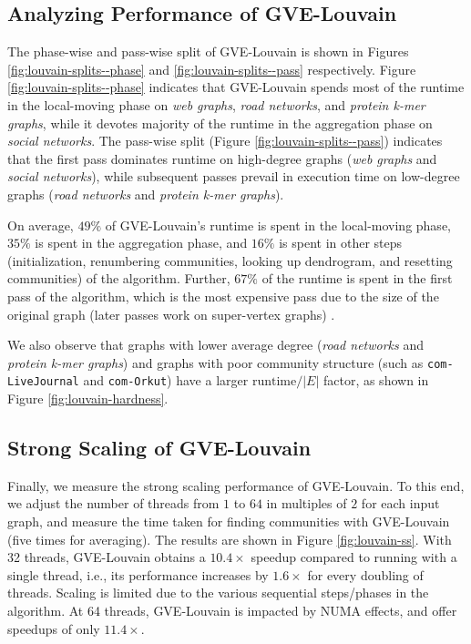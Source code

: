 






\subsection{Analyzing Performance of GVE-Louvain}

The phase-wise and pass-wise split of GVE-Louvain is shown in Figures \ref{fig:louvain-splits--phase} and \ref{fig:louvain-splits--pass} respectively. Figure \ref{fig:louvain-splits--phase} indicates that GVE-Louvain spends most of the runtime in the local-moving phase on \textit{web graphs}, \textit{road networks}, and \textit{protein k-mer graphs}, while it devotes majority of the runtime in the aggregation phase on \textit{social networks}. The pass-wise split (Figure \ref{fig:louvain-splits--pass}) indicates that the first pass dominates runtime on high-degree graphs (\textit{web graphs} and \textit{social networks}), while subsequent passes prevail in execution time on low-degree graphs (\textit{road networks} and \textit{protein k-mer graphs}).

On average, $49\%$ of GVE-Louvain's runtime is spent in the local-moving phase, $35\%$ is spent in the aggregation phase, and $16\%$ is spent in other steps (initialization, renumbering communities, looking up dendrogram, and resetting communities) of the algorithm. Further, $67\%$ of the runtime is spent in the first pass of the algorithm, which is the most expensive pass due to the size of the original graph (later passes work on super-vertex graphs) \cite{com-wickramaarachchi14}.

We also observe that graphs with lower average degree (\textit{road networks} and \textit{protein k-mer graphs}) and graphs with poor community structure (such as \verb|com-LiveJournal| and \verb|com-Orkut|) have a larger $\text{runtime}/|E|$ factor, as shown in Figure \ref{fig:louvain-hardness}.





\subsection{Strong Scaling of GVE-Louvain}

Finally, we measure the strong scaling performance of GVE-Louvain. To this end, we adjust the number of threads from $1$ to $64$ in multiples of $2$ for each input graph, and measure the time taken for finding communities with GVE-Louvain (five times for averaging). The results are shown in Figure \ref{fig:louvain-ss}. With 32 threads, GVE-Louvain obtains a $10.4\times$ speedup compared to running with a single thread, i.e., its performance increases by $1.6\times$ for every doubling of threads. Scaling is limited due to the various sequential steps/phases in the algorithm. At 64 threads, GVE-Louvain is impacted by NUMA effects, and offer speedups of only $11.4\times$.

